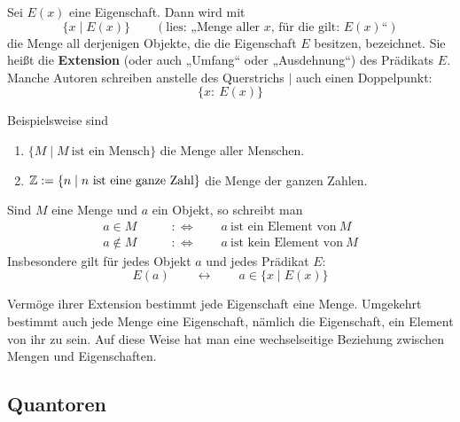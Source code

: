 \begin{de} \label{extensionimlogikkapitel}
    Sei $E(x)$ eine Eigenschaft. Dann wird mit
        \[ \{ x\mid E(x) \} \qquad (\text{lies: „Menge aller $x$, für die gilt: $E(x)$“})\]
    die Menge all derjenigen Objekte, die die Eigenschaft $E$ besitzen, bezeichnet. Sie heißt die \textbf{Extension} (oder auch „Umfang“ oder „Ausdehnung“) des Prädikats $E$. Manche Autoren schreiben anstelle des Querstrichs $\vert$ auch einen Doppelpunkt:
        \[ \{x:\ E(x) \}\]
\end{de}


\begin{bsp}
    Beispielsweise sind
    \begin{enumerate}
        \item $\{M\mid M\ \text{ist ein Mensch}\}$ die Menge aller Menschen.
        \item $\mathbb Z:= \{n\mid n\ \text{ist eine ganze Zahl}\}$ die Menge der ganzen Zahlen.
    \end{enumerate}
\end{bsp}


\begin{nota}[Elementzeichen]
    Sind $M$ eine Menge und $a$ ein Objekt, so schreibt man
    \begin{align*}
        a\in M\qquad&:\Leftrightarrow\qquad a\ \text{ist ein Element von}\ M \\
        a\notin M\qquad&:\Leftrightarrow\qquad a\ \text{ist kein Element von}\ M
    \end{align*}
    Insbesondere gilt für jedes Objekt $a$ und jedes Prädikat $E$:
        \[ E(a) \qquad\leftrightarrow\qquad a\in \{x\mid E(x)\} \]
\end{nota}


\begin{bem} \label{mengenvseig}
Vermöge ihrer Extension bestimmt jede Eigenschaft eine Menge. Umgekehrt bestimmt auch jede Menge eine Eigenschaft, nämlich die Eigenschaft, ein Element von ihr zu sein. Auf diese Weise hat man eine wechselseitige Beziehung zwischen Mengen und Eigenschaften.
\end{bem}





\subsection*{Quantoren}


